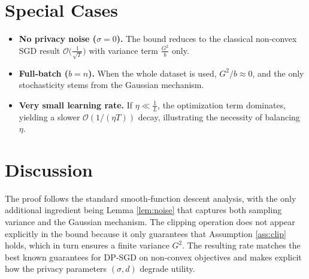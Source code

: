 \documentclass{article}
\begin{document}
\section*{Special Cases}
\begin{itemize}
\item \textbf{No privacy noise ($\sigma=0$).} The bound reduces to the classical non‑convex SGD result $\mathcal{O}\!\big(\frac{1}{\sqrt{T}}\big)$ with variance term $\frac{G^{2}}{b}$ only.
\item \textbf{Full‑batch ($b=n$).} When the whole dataset is used, $G^{2}/b\approx0$, and the only stochasticity stems from the Gaussian mechanism.
\item \textbf{Very small learning rate.} If $\eta\ll\frac{1}{L}$, the optimization term dominates, yielding a slower $\mathcal{O}(1/(\eta T))$ decay, illustrating the necessity of balancing $\eta$.
\end{itemize}

\section*{Discussion}
The proof follows the standard smooth‑function descent analysis, with the only additional ingredient being Lemma \ref{lem:noise} that captures both sampling variance and the Gaussian mechanism. The clipping operation does not appear explicitly in the bound because it only guarantees that Assumption \ref{ass:clip} holds, which in turn ensures a finite variance $G^{2}$. The resulting rate matches the best known guarantees for DP‑SGD on non‑convex objectives and makes explicit how the privacy parameters $(\sigma,d)$ degrade utility.
\end{document}
